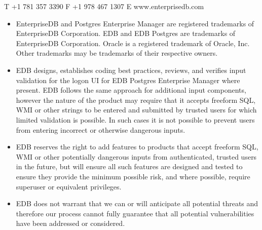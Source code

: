 \documentclass[letterpaper,10pt,english,openany,oneside]{sphinxmanual}
\begin{document}
T +1 781 357 3390 F +1 978 467 1307 E
www.enterprisedb.com
\begin{itemize}
\item {} 
EnterpriseDB and Postgres Enterprise Manager are registered trademarks of EnterpriseDB Corporation. EDB and EDB Postgres are trademarks of EnterpriseDB Corporation. Oracle is a registered trademark of Oracle, Inc. Other trademarks may be trademarks of their respective owners.

\item {} 
EDB designs, establishes coding best practices, reviews, and verifies input validation for the logon UI for EDB Postgres Enterprise Manager where present. EDB follows the same approach for additional input components, however the nature of the product may require that it accepts freeform SQL, WMI or other strings to be entered and submitted by trusted users for which limited validation is possible. In such cases it is not possible to prevent users from entering incorrect or otherwise dangerous inputs.

\item {} 
EDB reserves the right to add features to products that accept freeform SQL, WMI or other potentially dangerous inputs from authenticated, trusted users in the future, but will ensure all such features are designed and tested to ensure they provide the minimum possible risk, and where possible, require superuser or equivalent privileges.

\item {} 
EDB does not warrant that we can or will anticipate all potential threats and therefore our process cannot fully guarantee that all potential vulnerabilities have been addressed or considered.

\end{itemize}



\renewcommand{\indexname}{Index}
\printindex
\end{document}
